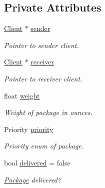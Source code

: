 \subsection*{Private Attributes}
\begin{DoxyCompactItemize}
\item 
\hyperlink{classClient}{Client} $\ast$ \hyperlink{classPackage_abacbedc4dee7b03adc395e6591a14fc2}{sender}\hypertarget{classPackage_abacbedc4dee7b03adc395e6591a14fc2}{}\label{classPackage_abacbedc4dee7b03adc395e6591a14fc2}

\begin{DoxyCompactList}\small\item\em Pointer to sender client. \end{DoxyCompactList}\item 
\hyperlink{classClient}{Client} $\ast$ \hyperlink{classPackage_a9331feb10443764e6992894866731eb8}{receiver}\hypertarget{classPackage_a9331feb10443764e6992894866731eb8}{}\label{classPackage_a9331feb10443764e6992894866731eb8}

\begin{DoxyCompactList}\small\item\em Pointer to receiver client. \end{DoxyCompactList}\item 
float \hyperlink{classPackage_ae45dfddbca19f89d50d3ea0960ed0a11}{weight}\hypertarget{classPackage_ae45dfddbca19f89d50d3ea0960ed0a11}{}\label{classPackage_ae45dfddbca19f89d50d3ea0960ed0a11}

\begin{DoxyCompactList}\small\item\em Weight of package in ounces. \end{DoxyCompactList}\item 
Priority \hyperlink{classPackage_a4ba73df5afb3cdd936d297652ce9af99}{priority}\hypertarget{classPackage_a4ba73df5afb3cdd936d297652ce9af99}{}\label{classPackage_a4ba73df5afb3cdd936d297652ce9af99}

\begin{DoxyCompactList}\small\item\em Priority enum of package. \end{DoxyCompactList}\item 
bool \hyperlink{classPackage_a468cb4f0c2ba246b7d349446e0839120}{delivered} = false\hypertarget{classPackage_a468cb4f0c2ba246b7d349446e0839120}{}\label{classPackage_a468cb4f0c2ba246b7d349446e0839120}

\begin{DoxyCompactList}\small\item\em \hyperlink{classPackage}{Package} delivered? \end{DoxyCompactList}\end{DoxyCompactItemize}

